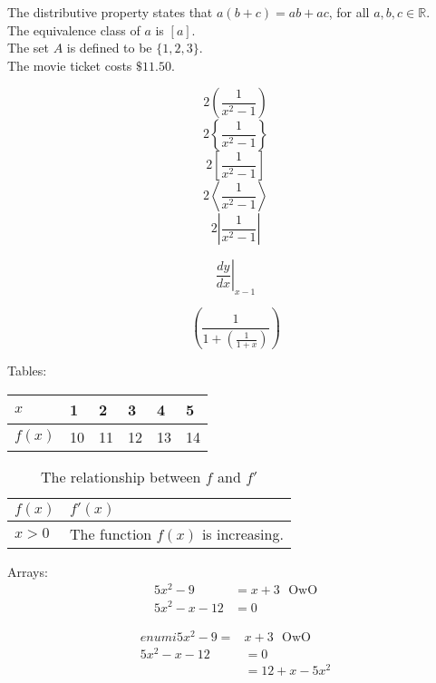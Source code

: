 \documentclass[11pt]{article}
\begin{document}
The distributive property states that $a(b+c)=ab+ac$, for all $a, b, c \in \mathbb{R}$. \\[6pt]
The equivalence class of $a$ is $[a]$.\\[6pt]
The set $A$ is defined to be $\{1, 2, 3\}$.\\[6pt] %
The movie ticket costs $\$11.50$.

\[2\left(\frac{1}{x^2-1}\right)\] %
\[2\left\{\frac{1}{x^2-1}\right\}\] %
\[2\left[\frac{1}{x^2-1}\right]\] %
\[2\left\langle\frac{1}{x^2-1}\right\rangle\] %
\[2\left|\frac{1}{x^2-1}\right|\]


\[\left.\frac{dy}{dx}\right|_{x-1}\]

\[\left(\frac{1}{1+\left(\frac{1}{1+x}\right)}\right)\]


Tables:

\begin{tabular}{l|l|l|l|l|l} %
    \hline
    $x$ & 1 & 2 & 3 & 4 & 5 \\ \hline
    $f(x)$ & 10 & 11 & 12 & 13 & 14 \\
    \hline
\end{tabular}

\vspace{1cm}    

\begin{table}[H]
    \centering
    \caption{The relationship between $f$ and $f'$}
\def\arraystretch{1.5} %
\begin{tabular}{l|p{4in}} %
    \hline
    $f(x)$ & $f'(x)$ \\ \hline
    $x>0$ & The function $f(x)$ is increasing. \\
    \hline
\end{tabular}
\end{table}


Arrays:
\begin{eqnarray}
    5x^2-9&=x+3\,\,\,\, \text{OwO}\\
    5x^2-x-12&=0
\end{eqnarray}

\begin{eqnarray}{enumi}
    5x^2-9=&x+3\,\,\,\, \text{OwO}\\
    5x^2-x-12&=0\\
    &=12+x-5x^2
\end{eqnarray}
\end{document}

